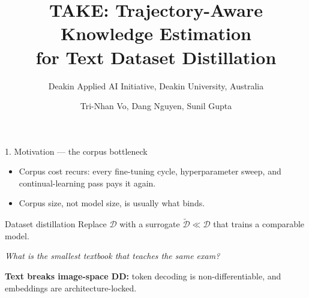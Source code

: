 \documentclass[aspectratio=169,11pt]{beamer}
\title{TAKE: Trajectory-Aware Knowledge Estimation\\for Text Dataset Distillation}
\author{Tri-Nhan Vo, Dang Nguyen, Sunil Gupta}
\subtitle{Deakin Applied AI Initiative, Deakin University, Australia}
\date{}
\newcommand{\Dtrain}{\mathcal{D}}
\newcommand{\Ddist}{\tilde{\mathcal{D}}}
\begin{document}
\maketitleslide


\begin{frame}{1. Motivation --- the corpus bottleneck}
  \begin{itemize}
    \item Corpus cost recurs: every fine-tuning cycle, hyperparameter sweep, and continual-learning pass pays it again.
    \item Corpus size, not model size, is usually what binds.
  \end{itemize}
  \medskip
  \begin{block}{Dataset distillation }
    Replace $\Dtrain$ with a surrogate $\Ddist \ll \Dtrain$ that trains a comparable model.\par\medskip
    \emph{What is the smallest textbook that teaches the same exam?}
  \end{block}
  \medskip
  \textbf{Text breaks image-space DD:} token decoding is non-differentiable, and embeddings are architecture-locked.
\end{frame}
\end{document}
